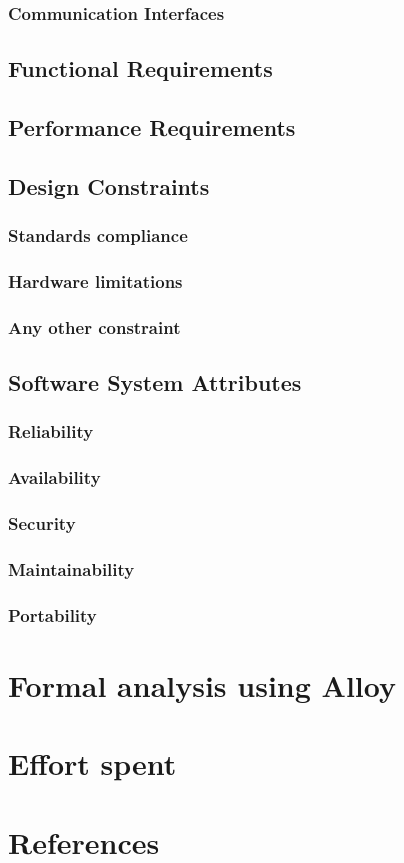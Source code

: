 \documentclass{article}
\begin{document}
            \subsubsection{Communication Interfaces}
        \subsection{Functional Requirements}
        \subsection{Performance Requirements}
        \subsection{Design Constraints}
            \subsubsection{Standards compliance}
            \subsubsection{Hardware limitations}
            \subsubsection{Any other constraint}
        \subsection{Software System Attributes}
                \subsubsection{Reliability}
                \subsubsection{Availability}
                \subsubsection{Security}
                \subsubsection{Maintainability}
                \subsubsection{Portability}
                
    \section{Formal analysis using Alloy}
    
    \section{Effort spent}
    
    \section{References}
\end{document}
